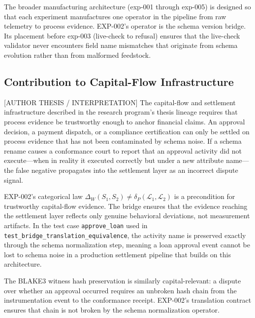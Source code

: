 The broader manufacturing architecture (exp-001 through exp-005) is designed so that
each experiment manufactures one operator in the pipeline from raw telemetry to
process evidence. EXP-002's operator is the schema version bridge. Its placement
before exp-003 (live-check to refusal) ensures that the live-check validator never
encounters field name mismatches that originate from schema evolution rather than
from malformed feedstock.

\subsection{Contribution to Capital-Flow Infrastructure}
\label{sec:otel-weaver-exp-002-diff-to-residual-contribution-capital}

\textsc{[AUTHOR THESIS / INTERPRETATION]} The capital-flow and settlement
infrastructure described in the research program's thesis lineage requires that
process evidence be trustworthy enough to anchor financial claims. An approval
decision, a payment dispatch, or a compliance certification can only be settled on
process evidence that has not been contaminated by schema noise. If a schema rename
causes a conformance court to report that an approval activity did not execute---when
in reality it executed correctly but under a new attribute name---the false negative
propagates into the settlement layer as an incorrect dispute signal.

EXP-002's categorical law $\Delta_W(S_1, S_2) \neq \delta_P(\mathcal{L}_1, \mathcal{L}_2)$
is a precondition for trustworthy capital-flow evidence. The bridge ensures that the
evidence reaching the settlement layer reflects only genuine behavioral deviations,
not measurement artifacts. In the test case \texttt{approve\_loan} used in
\texttt{test\_bridge\_translation\_equivalence}, the activity name is preserved
exactly through the schema normalization step, meaning a loan approval event cannot
be lost to schema noise in a production settlement pipeline that builds on this
architecture.

The BLAKE3 witness hash preservation is similarly capital-relevant: a dispute
over whether an approval occurred requires an unbroken hash chain from the
instrumentation event to the conformance receipt. EXP-002's translation contract
ensures that chain is not broken by the schema normalization operator.
